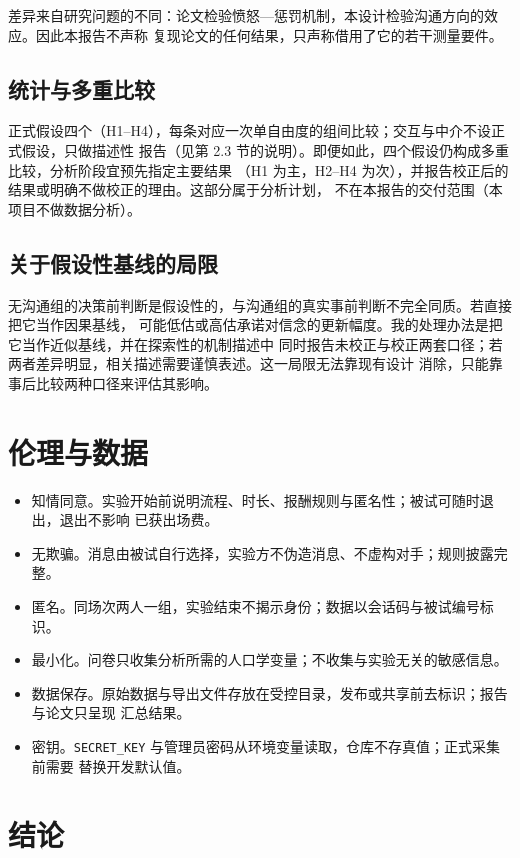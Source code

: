 \documentclass[10pt,a4paper]{ctexart}
\newcommand{\code}[1]{\texttt{#1}}
\begin{document}
差异来自研究问题的不同：论文检验愤怒—惩罚机制，本设计检验沟通方向的效应。因此本报告不声称
复现论文的任何结果，只声称借用了它的若干测量要件。

\subsection{统计与多重比较}

正式假设四个（H1--H4），每条对应一次单自由度的组间比较；交互与中介不设正式假设，只做描述性
报告（见第 2.3 节的说明）。即便如此，四个假设仍构成多重比较，分析阶段宜预先指定主要结果
（H1 为主，H2--H4 为次），并报告校正后的结果或明确不做校正的理由。这部分属于分析计划，
不在本报告的交付范围（本项目不做数据分析）。

\subsection{关于假设性基线的局限}

无沟通组的决策前判断是假设性的，与沟通组的真实事前判断不完全同质。若直接把它当作因果基线，
可能低估或高估承诺对信念的更新幅度。我的处理办法是把它当作近似基线，并在探索性的机制描述中
同时报告未校正与校正两套口径；若两者差异明显，相关描述需要谨慎表述。这一局限无法靠现有设计
消除，只能靠事后比较两种口径来评估其影响。

\section{伦理与数据}

\begin{itemize}
  \item 知情同意。实验开始前说明流程、时长、报酬规则与匿名性；被试可随时退出，退出不影响
        已获出场费。
  \item 无欺骗。消息由被试自行选择，实验方不伪造消息、不虚构对手；规则披露完整。
  \item 匿名。同场次两人一组，实验结束不揭示身份；数据以会话码与被试编号标识。
  \item 最小化。问卷只收集分析所需的人口学变量；不收集与实验无关的敏感信息。
  \item 数据保存。原始数据与导出文件存放在受控目录，发布或共享前去标识；报告与论文只呈现
        汇总结果。
  \item 密钥。\code{SECRET\_KEY} 与管理员密码从环境变量读取，仓库不存真值；正式采集前需要
        替换开发默认值。
\end{itemize}

\section{结论}
\end{document}
